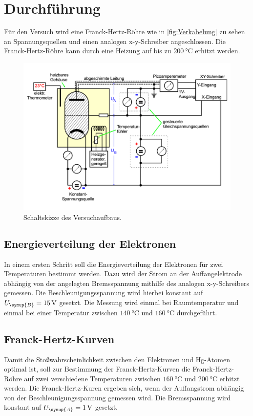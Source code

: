 \section{Durchführung}
\label{sec:Durchführung}
Für den Versuch wird eine Franck-Hertz-Röhre wie in \autoref{fig:Verkabelung} zu sehen an Spannungsquellen und einen analogen 
x-y-Schreiber angeschlossen. Die Franck-Hertz-Röhre kann durch eine Heizung auf bis zu $\qty{200}{\celsius}$ erhitzt werden.
\begin{figure}[H]
    \centering
    \includegraphics[height=8cm]{content/pics/Verkabelung.pdf}
    \caption{Schaltskizze des Versuchaufbaus.\cite{v601}}
    \label{fig:Verkabelung}
\end{figure}

\subsection{Energieverteilung der Elektronen}
\label{sec:Engergieverteilung Elektronen}
In einem ersten Schritt soll die Energieverteilung der Elektronen für zwei Temperaturen bestimmt werden. Dazu wird der Strom 
an der Auffangelektrode abhängig von der angelegten Bremsspannung mithilfe des analogen x-y-Schreibers gemessen. Die 
Beschleunigungsspannung wird hierbei konstant auf $U_{\symup{B}}=\qty{15}{\volt}$ gesetzt. Die Messung wird einmal bei 
Raumtemperatur und einmal bei einer Temperatur zwischen $\qty{140}{\celsius}$ und $\qty{160}{\celsius}$ durchgeführt.

\subsection{Franck-Hertz-Kurven}
\label{sec:Franck-Hertz-Kurven}
Damit die Stoßwahrscheinlichkeit zwischen den Elektronen und Hg-Atomen optimal ist, soll zur Bestimmung der Franck-Hertz-Kurven
die Franck-Hertz-Röhre auf zwei verschiedene Temperaturen zwischen $\qty{160}{\celsius}$ und $\qty{200}{\celsius}$ erhitzt werden.
Die Franck-Hertz-Kuren ergeben sich, wenn der Auffangstrom abhängig von der Beschleunigungsspannung gemessen wird. Die 
Bremsspannung wird konstant auf $U_{\symup{A}} = \qty{1}{\volt}$ gesetzt.
